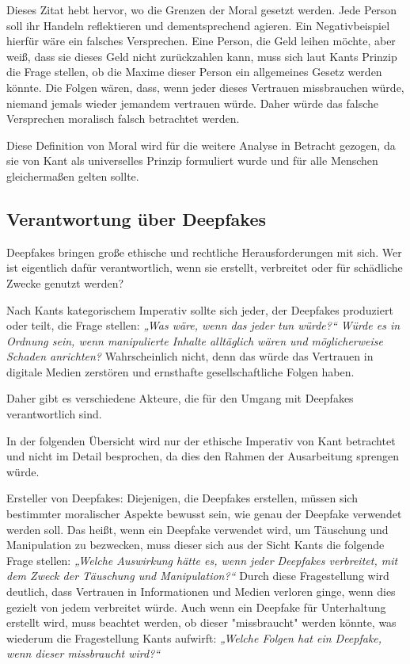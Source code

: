 \documentclass[a4paper,12pt]{article}
\begin{document}
Dieses Zitat hebt hervor, wo die Grenzen der Moral gesetzt werden. 
Jede Person soll ihr Handeln reflektieren und dementsprechend agieren. Ein Negativbeispiel hierfür wäre ein falsches Versprechen. 
Eine Person, die Geld leihen möchte, aber weiß, dass sie dieses Geld nicht zurückzahlen kann, muss sich laut Kants Prinzip die Frage stellen, 
ob die Maxime dieser Person ein allgemeines Gesetz werden könnte. Die Folgen wären, dass, wenn jeder dieses Vertrauen missbrauchen würde, niemand jemals wieder jemandem vertrauen würde. 
Daher würde das falsche Versprechen moralisch falsch betrachtet werden. \cite{KantMetaphysik}

Diese Definition von Moral wird für die weitere Analyse in Betracht gezogen, da sie von Kant als universelles Prinzip formuliert wurde und für alle Menschen gleichermaßen gelten sollte.

\subsection{Verantwortung über Deepfakes}
Deepfakes bringen große ethische und rechtliche Herausforderungen mit sich. Wer ist eigentlich dafür verantwortlich, wenn sie erstellt, verbreitet oder für schädliche Zwecke genutzt werden?

Nach Kants kategorischem Imperativ sollte sich jeder, der Deepfakes produziert oder teilt, 
die Frage stellen: \textit{„Was wäre, wenn das jeder tun würde?“ Würde es in Ordnung sein, wenn manipulierte Inhalte alltäglich wären und möglicherweise Schaden anrichten?} 
Wahrscheinlich nicht, denn das würde das Vertrauen in digitale Medien zerstören und ernsthafte gesellschaftliche Folgen haben. \cite{KantMetaphysik}

Daher gibt es verschiedene Akteure, die für den Umgang mit Deepfakes verantwortlich sind.

In der folgenden Übersicht wird nur der ethische Imperativ von Kant betrachtet und nicht im Detail besprochen, da dies den Rahmen der Ausarbeitung sprengen würde.

Ersteller von Deepfakes:
Diejenigen, die Deepfakes erstellen, müssen sich bestimmter moralischer Aspekte bewusst sein, wie genau der Deepfake verwendet werden soll. 
Das heißt, wenn ein Deepfake verwendet wird, um Täuschung und Manipulation zu bezwecken, 
muss dieser sich aus der Sicht Kants die folgende Frage stellen: \textit{„Welche Auswirkung hätte es, wenn jeder Deepfakes verbreitet, mit dem Zweck der Täuschung und Manipulation?“} 
Durch diese Fragestellung wird deutlich, dass Vertrauen in Informationen und Medien verloren ginge, wenn dies gezielt von jedem verbreitet würde. Auch wenn ein Deepfake für Unterhaltung erstellt wird, muss beachtet werden, ob dieser "missbraucht" werden könnte, was wiederum die Fragestellung Kants aufwirft: \textit{„Welche Folgen hat ein Deepfake, wenn dieser missbraucht wird?“}\cite{IJS2025}\cite{KantMetaphysik}
\end{document}
